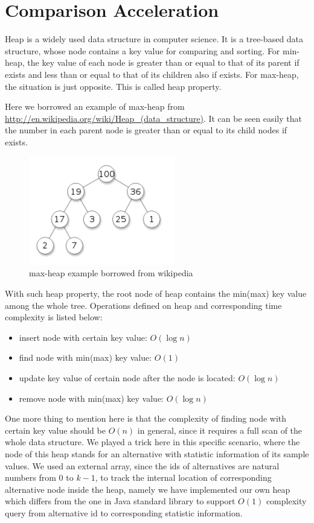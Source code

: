 \documentclass[12pt,a4paper]{report}
\begin{document}
\chapter{Comparison Acceleration}

Heap is a widely used data structure in computer science. It is a tree-based data structure, whose node contains a key value for comparing and sorting. For min-heap, the key value of each node is greater than or equal to that of its parent if exists and less than or equal to that of its children also if exists. For max-heap, the situation is just opposite. This is called heap property.

Here we borrowed an example of max-heap from \url{http://en.wikipedia.org/wiki/Heap_(data_structure)}. It can be seen easily that the number in each parent node is greater than or equal to its child nodes if exists.

\begin{figure}[ht]
\centering
\includegraphics[width=64mm]{heap.png}
\caption{max-heap example borrowed from wikipedia}
\end{figure}

With such heap property, the root node of heap contains the min(max) key value among the whole tree. Operations defined on heap and corresponding time complexity is listed below:

\begin{itemize}
\item insert node with certain key value: $O(\log n)$
\item find node with min(max) key value: $O(1)$
\item update key value of certain node after the node is located: $O(\log n)$
\item remove node with min(max) key value: $O(\log n)$
\end{itemize}

One more thing to mention here is that the complexity of finding node with certain key value should be $O(n)$ in general, since it requires a full scan of the whole data structure. We played a trick here in this specific scenario, where the node of this heap stands for an alternative with statistic information of its sample values. We used an external array, since the ids of alternatives are natural numbers from $0$ to $k - 1$, to track the internal location of corresponding alternative node inside the heap, namely we have implemented our own heap which differs from the one in Java standard library to support $O(1)$ complexity query from alternative id to corresponding statistic information.
\end{document}
